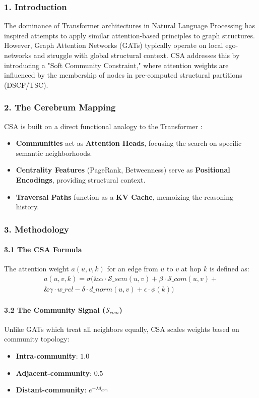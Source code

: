 \documentclass[10pt,journal,compsoc]{IEEEtran}
\begin{document}
\subsubsection{1. Introd\-uction}
The dominance of Transformer archi\-tectures in Natural Language Processing has inspired attempts to apply similar attention-based principles to graph structures. However, Graph Attention Networks (GATs) \cite{velickovic2018gat} typically operate on local ego-networks and struggle with global structural context. CSA addresses this by introducing a "Soft Community Constraint," where attention weights are influenced by the membership of nodes in pre-computed structural partitions (DSCF/TSC).

\subsubsection{2. The Cerebrum Mapping}
CSA is built on a direct functional analogy to the Transformer \cite{vaswani2017attention}:
\begin{itemize}
\item \textbf{Communities} act as \textbf{Attention Heads}, focusing the search on specific semantic neigh\-borhoods.
\item \textbf{Centrality Features} (PageRank, Betweenness) serve as \textbf{Positional Encodings}, providing structural context.
\item \textbf{Traversal Paths} function as a \textbf{KV Cache}, memoizing the reasoning history.

\end{itemize}
\subsubsection{3. Methodology}

\paragraph{3.1 The CSA Formula}
The attention weight $a(u,v,k)$ for an edge from $u$ to $v$ at hop $k$ is defined as:
$$\begin{aligned}
a(u,v,k) = \sigma( \& \alpha \cdot \mathcal{S}\_{sem}(u,v) + \beta \cdot \mathcal{S}\_{com}(u,v) + \\
\& \gamma \cdot w\_{rel} - \delta \cdot d\_{norm}(u,v) + \epsilon \cdot \phi(k) )
\end{aligned}$$

\paragraph{3.2 The Community Signal ($\mathcal{S}_{com}$)}
Unlike GATs \cite{velickovic2018gat} which treat all neighbors equally, CSA scales weights based on community topology:
\begin{itemize}
\item \textbf{Intra-community}: $1.0$
\item \textbf{Adjacent-community}: $0.5$
\item \textbf{Distant-community}: $e^{-\lambda d_{com}}$

\end{itemize}
\end{document}
